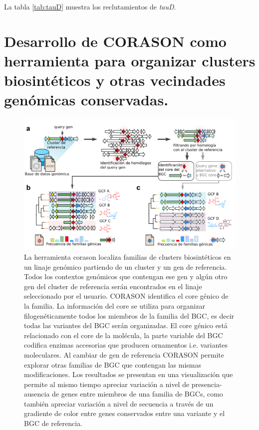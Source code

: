 \documentclass[12pt,twoside]{reedthesis}
\begin{document}
  La tabla \autoref{tab:tauD} muestra los reclutamientos de \emph{tauD}.
  
  \chapter{Desarrollo de CORASON como herramienta para organizar clusters
  biosintéticos y otras vecindades genómicas
  conservadas.}\label{desarrollo-de-corason-como-herramienta-para-organizar-clusters-biosinteticos-y-otras-vecindades-genomicas-conservadas.}
  
  \begin{figure}[h!tbp]
  \centering
  \includegraphics[angle = 0,scale = .6]{chapter3/Corason-pipe.pdf}
  \caption[La herramienta corason localiza familias de clusters biosintéticos en un linaje genómico partiendo de un cluster y un gen de referencia.]{\footnotesize{La herramienta corason localiza familias de clusters biosintéticos en un linaje genómico partiendo de un cluster y un gen de referencia. Todos los contextos genómicos que contengan ese gen y algún otro gen del cluster de referencia serán encontrados en el linaje seleccionado por el usuario. CORASON identifica el core génico de la familia. La información del core se utiliza para organizar filogenéticamente todos los miembros de la familia del BGC, es decir todas las variantes del BGC serán organizadas. El core génico está relacionado con el core de la molécula, la parte variable del BGC codifica enzimas accesorias que producen ornamentos i.e. variantes moleculares. Al cambiar de gen de referencia CORASON permite explorar otras familias de BGC que contengan las mismas modificaciones. Los resultados se presentan en una visualización que permite al mismo tiempo apreciar variación a nivel de presencia-ausencia de genes entre miembros de una familia de BGCs, como también apreciar variación a nivel de secuencia a través de un gradiente de color entre genes conservados entre una variante y el BGC de referencia.}}
  \label{fig:Corason-pipe}
  \end{figure}
  
\end{document}
